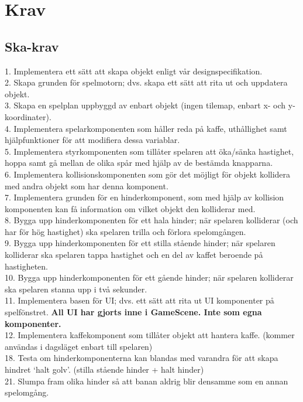 \documentclass{template}
\begin{document}
\section{Krav}
\subsection{Ska-krav}
1. Implementera ett sätt att skapa objekt enligt vår designspecifikation. \\
2. Skapa grunden för spelmotorn; dvs. skapa ett sätt att rita ut och uppdatera objekt.\\
3. Skapa en spelplan uppbyggd av enbart objekt (ingen tilemap, enbart x- och y-koordinater). \\
4. Implementera spelarkomponenten som håller reda på kaffe, uthållighet samt hjälpfunktioner för att modifiera dessa variablar.\\
5. Implementera styrkomponenten som tillåter spelaren att öka/sänka hastighet, hoppa samt gå mellan de olika spår med hjälp av de bestämda knapparna.\\
6. Implementera kollisionskomponenten som gör det möjligt för objekt kollidera med andra objekt som har denna komponent.\\
7. Implementera grunden för en hinderkomponent, som med hjälp av kollision komponenten kan få information om vilket objekt den kolliderar med.\\
8. Bygga upp hinderkomponenten för ett hala hinder; när spelaren kolliderar (och har för hög hastighet) ska spelaren trilla och förlora spelomgången.\\
9. Bygga upp hinderkomponenten för ett stilla stående hinder; när spelaren kolliderar ska spelaren tappa hastighet och en del av kaffet beroende på hastigheten.\\
10. Bygga upp hinderkomponenten för ett gående hinder; när spelaren kolliderar ska spelaren stanna upp i två sekunder.\\
11. Implementera basen för UI; dvs. ett sätt att rita ut UI komponenter på spelfönstret. \textbf{All UI har gjorts inne i GameScene. Inte som egna komponenter.}\\
12. Implementera kaffekomponent som tillåter objekt att hantera kaffe. (kommer användas i dagsläget enbart till spelaren)\\
18. Testa om hinderkomponenterna kan blandas med varandra för att skapa hindret `halt golv'. (stilla stående hinder + halt hinder)\\
21. Slumpa fram olika hinder så att banan aldrig blir densamme som en annan spelomgång.\\
\end{document}

